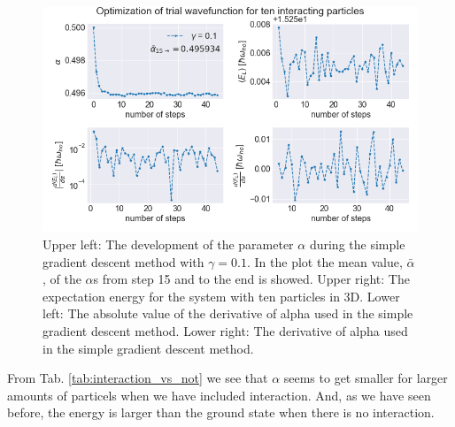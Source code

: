 \begin{figure}[H]
\center
\includegraphics[width=\linewidth]{../Results/gradient_descent_interaction_10p}\caption{Upper left: The development of the parameter $\alpha$ during the simple gradient descent method with $\gamma = 0.1$. In the plot the mean value, $\bar{\alpha}$, of the $\alpha$s from step 15 and to the end is showed. Upper right: The expectation energy for the system with ten particles in 3D. Lower left: The absolute value of the derivative of alpha used in the simple gradient descent method. Lower right: The derivative of alpha used in the simple gradient descent method. }\label{fig:interaction_gradient_descent_N_10}
\end{figure}

From Tab. \ref{tab:interaction_vs_not} we see that $\alpha$ seems to get smaller for larger amounts of particels when we have included interaction. And, as we have seen before, the energy is larger than the ground state when there is no interaction.

